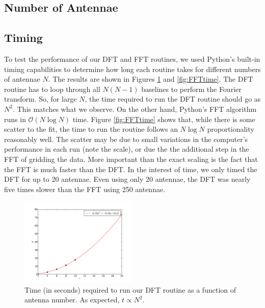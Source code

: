 \documentclass[11pt,letterpaper]{article}
\begin{document}
\subsection{Number of Antennae}

\subsection{Timing}
To test the performance of our DFT and FFT routines, we used Python's built-in 
timing capabilities to determine how long each routine takes for different 
numbers of antennae $N$.  The results are shown in Figures \ref{fig:DFTtime} and 
\ref{fig:FFTtime}.  The DFT routine has to loop through all $N(N-1)$ baselines 
to perform the Fourier transform.  So, for large $N$, the time required to 
run the DFT routine should go as $N^2$.  This matches what we observe.  On the 
other hand, Python's FFT algorithm runs in $\mathcal{O}(N\log N)$ time.  Figure 
\ref{fig:FFTtime} shows that, while there is some scatter to the fit, the time 
to run the routine follows an $N\log N$ proportionality reasonably well.  
The scatter may be due to small variations in the computer's performance in 
each run (note the scale), or due the the additional step in the FFT of 
gridding the data.  More important than the exact scaling is the fact that 
the FFT is much faster than the DFT.  In the interest of time, we only timed 
the DFT for up to 20 antennae.  Even using only 20 antennae, the DFT was nearly 
five times slower than the FFT using 250 antennae.

\begin{figure}[!h]
\centering
\includegraphics[width=0.5\textwidth]{DFT_image_timing.pdf}
\caption{Time (in seconds) required to run our DFT routine as a function of 
antenna number.  As expected, $t\propto N^2$.}
\label{fig:DFTtime}
\end{figure}
\end{document}
